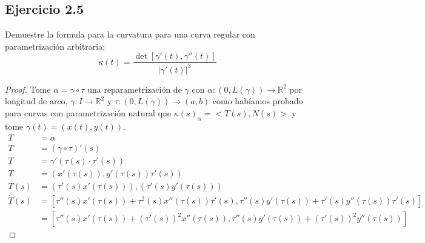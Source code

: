\documentclass[12pt]{article}
\begin{document}
\subsection*{Ejercicio 2.5}
Demuestre la formula para la curvatura para una curva regular con parametrizaci\'on arbitraria:
\begin{equation*}
\kappa(t)=\frac{\det[\gamma'(t),\gamma''(t)]}{|\gamma'(t)|^{3}}
\end{equation*}
\begin{proof}
Tome $\alpha= \gamma \circ \tau$ una reparametrizaci\'on de $\gamma$ con $\alpha: (0,L(\gamma)) \rightarrow \mathbb{R}^2$ por longitud de arco, $\gamma:I \rightarrow \mathbb{R}^2$ y $\tau: (0,L(\gamma)) \rightarrow (a,b)$ como hab\'iamos probado para curvas con parametrizaci\'on natural que $\kappa(s)_{\alpha}=<\dot{T}(s),N(s)>$ y tome $\gamma(t)=(x(t),y(t))$.
\begin{equation*}
\begin{split}
T&=\dot{\alpha}\\
T&=(\gamma \circ \tau)'(s)\\
T&=\gamma'(\tau(s) \cdot \tau'(s))\\
T&=(x'(\tau(s)), y'(\tau(s))\tau'(s))\\
T(s)&=(\tau'(s)x'(\tau(s))), (\tau'(s)y'(\tau(s)))\\
\dot{T}(s)&=[\tau''(s)x'(\tau(s)) + \tau^2(s)x''(\tau(s))\tau'(s), \tau''(s)y'(\tau(s))+\tau'(s)y''(\tau(s))\tau'(s)] \\
&=[\tau''(s)x'(\tau(s))+(\tau'(s))^2x''(\tau(s)), \tau''(s)y'(\tau(s))+(\tau'(s))^2y''(\tau(s))]
\end{split}
\end{equation*}


\end{proof}
\end{document}
